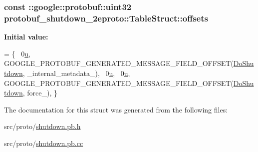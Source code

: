 \subsubsection[{\texorpdfstring{offsets}{offsets}}]{\setlength{\rightskip}{0pt plus 5cm}const \+::google\+::protobuf\+::uint32 protobuf\+\_\+shutdown\+\_\+2eproto\+::\+Table\+Struct\+::offsets\hspace{0.3cm}{\ttfamily [static]}}\hypertarget{structprotobuf__shutdown__2eproto_1_1_table_struct_a94a26cb4e92cde7ab04e2e80f102a7d2}{}\label{structprotobuf__shutdown__2eproto_1_1_table_struct_a94a26cb4e92cde7ab04e2e80f102a7d2}
{\bfseries Initial value\+:}
\begin{DoxyCode}
= \{
  ~0\hyperlink{pem_8h_aae315ef0aa014d60426f50686217d264}{u},  
  GOOGLE\_PROTOBUF\_GENERATED\_MESSAGE\_FIELD\_OFFSET(\hyperlink{class_do_shutdown}{DoShutdown}, \_internal\_metadata\_),
  ~0\hyperlink{pem_8h_aae315ef0aa014d60426f50686217d264}{u},  
  ~0\hyperlink{pem_8h_aae315ef0aa014d60426f50686217d264}{u},  
  GOOGLE\_PROTOBUF\_GENERATED\_MESSAGE\_FIELD\_OFFSET(\hyperlink{class_do_shutdown}{DoShutdown}, force\_),
\}
\end{DoxyCode}


The documentation for this struct was generated from the following files\+:\begin{DoxyCompactItemize}
\item 
src/proto/\hyperlink{shutdown_8pb_8h}{shutdown.\+pb.\+h}\item 
src/proto/\hyperlink{shutdown_8pb_8cc}{shutdown.\+pb.\+cc}\end{DoxyCompactItemize}
